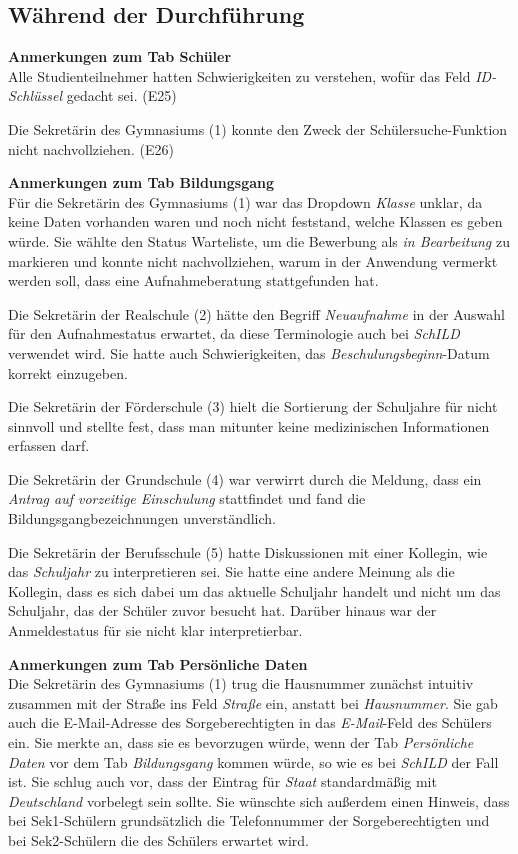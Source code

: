 \subsection{Während der Durchführung}

\textbf{Anmerkungen zum Tab \glqq Schüler\grqq{}}\\  
Alle Studienteilnehmer hatten Schwierigkeiten zu verstehen, wofür das Feld \textit{ID-Schlüssel} gedacht sei. (E25)

Die Sekretärin des Gymnasiums (1) konnte den Zweck der Schülersuche-Funktion nicht nachvollziehen. (E26)


\textbf{Anmerkungen zum Tab \glqq Bildungsgang\grqq{}}\\
Für die Sekretärin des Gymnasiums (1) war das Dropdown \textit{Klasse} unklar, da keine Daten vorhanden waren und noch nicht feststand, welche Klassen es geben würde. Sie wählte den Status \glqq Warteliste\grqq{}, um die Bewerbung als \textit{in Bearbeitung} zu markieren und konnte nicht nachvollziehen, warum in der Anwendung vermerkt werden soll, dass eine Aufnahmeberatung stattgefunden hat.

Die Sekretärin der Realschule (2) hätte den Begriff \textit{Neuaufnahme} in der Auswahl für den Aufnahmestatus erwartet, da diese Terminologie auch bei \textit{SchILD} verwendet wird. Sie hatte auch Schwierigkeiten, das \textit{Beschulungsbeginn}-Datum korrekt einzugeben.

Die Sekretärin der Förderschule (3) hielt die Sortierung der Schuljahre für nicht sinnvoll und stellte fest, dass man mitunter keine medizinischen Informationen erfassen darf.

Die Sekretärin der Grundschule (4) war verwirrt durch die Meldung, dass ein \textit{Antrag auf vorzeitige Einschulung} stattfindet und fand die Bildungsgangbezeichnungen unverständlich.

Die Sekretärin der Berufsschule (5) hatte Diskussionen mit einer Kollegin, wie das \textit{Schuljahr} zu interpretieren sei. Sie hatte eine andere Meinung als die Kollegin, dass es sich dabei um das aktuelle Schuljahr handelt und nicht um das Schuljahr, das der Schüler zuvor besucht hat. Darüber hinaus war der Anmeldestatus für sie nicht klar interpretierbar.

\textbf{Anmerkungen zum Tab \glqq Persönliche Daten\grqq{}}\\
Die Sekretärin des Gymnasiums (1) trug die Hausnummer zunächst intuitiv zusammen mit der Straße ins Feld \textit{Straße} ein, anstatt bei \textit{Hausnummer}. Sie gab auch die E-Mail-Adresse des Sorgeberechtigten in das \textit{E-Mail}-Feld des Schülers ein. Sie merkte an, dass sie es bevorzugen würde, wenn der Tab \textit{Persönliche Daten} vor dem Tab \textit{Bildungsgang} kommen würde, so wie es bei \textit{SchILD}  der Fall ist. Sie schlug auch vor, dass der Eintrag für \textit{Staat} standardmäßig mit \textit{Deutschland} vorbelegt sein sollte. Sie wünschte sich außerdem einen Hinweis, dass bei Sek1-Schülern grundsätzlich die Telefonnummer der Sorgeberechtigten und bei Sek2-Schülern die des Schülers erwartet wird.

